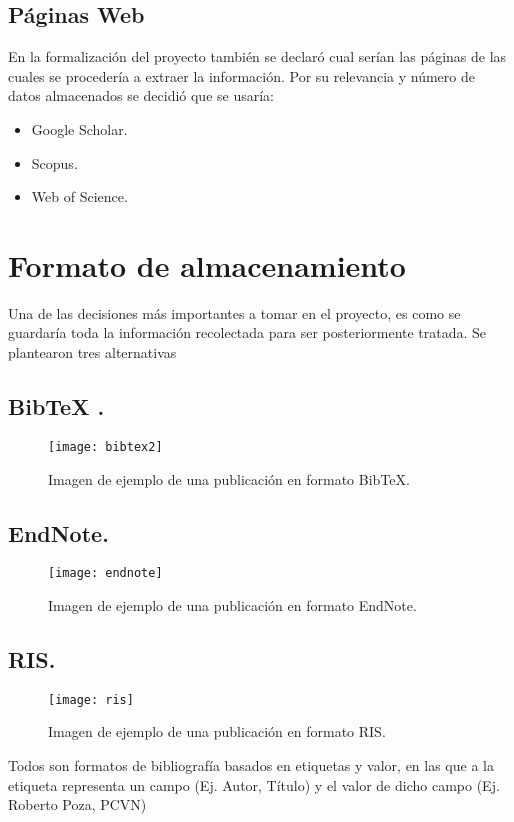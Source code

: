 \subsection{Páginas Web}
En la formalización del proyecto también se declaró cual serían las páginas de las cuales se procedería a extraer la información. Por su relevancia y número de datos almacenados se decidió que se usaría:
\begin{itemize}
	\item Google Scholar.
	\item Scopus.
	\item Web of Science.
	
\end{itemize}

\section{Formato de almacenamiento}
Una de las decisiones más importantes a tomar en el proyecto, es como se guardaría toda la información recolectada para ser posteriormente tratada. Se plantearon tres alternativas
\subsection{BibTeX .}
	\begin{figure}[H]
		\centering
		\texttt{[image: bibtex2]}
		\caption{Imagen de ejemplo de una publicación en formato BibTeX.}
		\label{fig:bibtex2}
	\end{figure}
	
\subsection{EndNote.}
	\begin{figure}[H]
		\centering
		\texttt{[image: endnote]}
		\caption{Imagen de ejemplo de una publicación en formato EndNote.}
		\label{fig:endnote}
	\end{figure}

\subsection{RIS.} 
	\begin{figure}[H]
		\centering
		\texttt{[image: ris]}
		\caption{Imagen de ejemplo de una publicación en formato RIS.}
		\label{fig:ris}
	\end{figure}
	
Todos son formatos de bibliografía basados en etiquetas y valor, en las que a la etiqueta representa un campo (Ej. Autor, Título) y el valor de dicho campo (Ej. Roberto Poza, PCVN)

